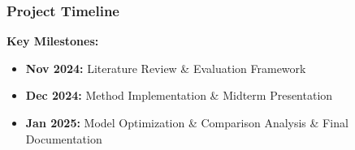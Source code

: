 \documentclass{beamer}
\begin{document}
\begin{frame}
    \frametitle{Project Timeline}
    
    \textbf{Key Milestones:}
    \begin{itemize}
        \item \textbf{Nov 2024:} Literature Review \& Evaluation Framework
        \item \textbf{Dec 2024:} Method Implementation \& Midterm Presentation
        \item \textbf{Jan 2025:} Model Optimization \& Comparison Analysis \& Final Documentation
    \end{itemize}
\end{frame}
\end{document}

